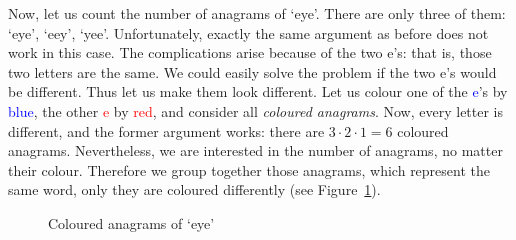 Now, let us count the number of anagrams of `eye'. 
There are only three of them: 
`eye', `eey', `yee'. 
Unfortunately, 
exactly the same argument as before does  not work in this case. 
The complications arise because of the two e's: 
that is, those two letters are the same. 
We could easily solve the problem if the two e's would be different. 
Thus let us make them look different. 
Let us colour one of the \textcolor{blue}{e}'s by \textcolor{blue}{blue}, the other \textcolor{red}{e} by \textcolor{red}{red}, 
and consider all \emph{coloured anagrams}. 
Now, every letter is different, 
and the former argument works: 
there are $3\cdot 2 \cdot 1 = 6$ coloured anagrams. 
Nevertheless, we are interested in the number of anagrams, 
no matter their colour. 
Therefore we group together those anagrams, 
which represent the same word, 
only they are coloured differently 
(see Figure~\ref{fig:eye}). 

\begin{figure}[!htb]
\begin{center}
\end{center}
\caption{Coloured anagrams of `eye'}\label{fig:eye}
\end{figure}
%

